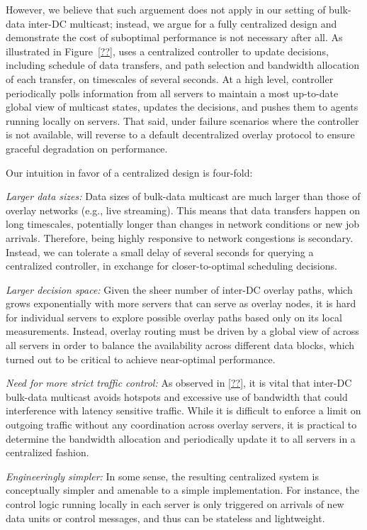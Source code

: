 However, we believe that such arguement does not apply in our 
setting of bulk-data inter-DC multicast; instead, we argue for 
a fully centralized design and demonstrate the cost of
suboptimal performance is not necessary after all.
As illustrated in Figure~\ref{??}, 
\name uses a centralized controller to update decisions,
including schedule of data transfers, and path selection and 
bandwidth allocation of each transfer, on timescales of 
several seconds.
At a high level, \name controller periodically polls information
from all servers to maintain a most up-to-date global view of 
multicast states, updates the decisions, and pushes them 
to agents running locally on servers.
That said, under failure scenarios where the controller is 
not available, \name will reverse to a default decentralized
overlay protocol to ensure graceful degradation on performance.

Our intuition in favor of a centralized design is four-fold:
\begin{packedenumerate}
\item {\em Larger data sizes:} 
Data sizes of bulk-data multicast are much larger 
than those of overlay networks (e.g., live streaming).
This means that data transfers happen on long timescales, 
potentially longer than changes in network conditions or 
new job arrivals. 
Therefore, being highly responsive to network congestions 
is secondary.
Instead, we can tolerate a small delay of several seconds for
querying a centralized controller,
in exchange for closer-to-optimal scheduling decisions.
\item {\em Larger decision space:} 
Given the sheer number of inter-DC overlay paths, 
which grows exponentially with more servers that can
serve as overlay nodes, 
it is hard for individual servers to explore possible overlay 
paths based only on its local measurements.
Instead, overlay routing must be driven by a global 
view of across all servers in order to 
balance the availability across different data blocks, which 
turned out to be critical to achieve near-optimal performance.
\item {\em Need for more strict traffic control:}
As observed in \Section\ref{??}, it is vital that inter-DC 
bulk-data multicast avoids hotspots and excessive use of 
bandwidth that could interference with latency sensitive traffic.
While it is difficult to enforce a limit on outgoing traffic
without any coordination across overlay servers, it is practical
to determine the bandwidth allocation and periodically update it
to all servers in a centralized fashion.
\item {\em Engineeringly simpler:} 
In some sense, the resulting centralized system is conceptually
simpler and amenable to a simple implementation.
For instance, the control logic running locally in each server
is only triggered on arrivals of new data units or control messages,
and thus can be stateless and lightweight.

\end{packedenumerate}

